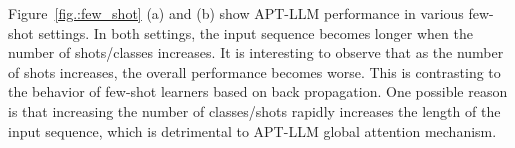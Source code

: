 \documentclass{article} %
\begin{document}
Figure~\ref{fig.:few_shot} (a) and (b) show APT-LLM performance in various few-shot settings. In both settings, the input sequence becomes longer when the number of shots/classes increases. It is interesting to observe that as the number of shots increases, the overall performance becomes worse. This is contrasting to the behavior of few-shot learners based on back propagation. One possible reason is that increasing the number of classes/shots rapidly increases the length of the input sequence, which is detrimental to APT-LLM global attention mechanism.
\end{document}
